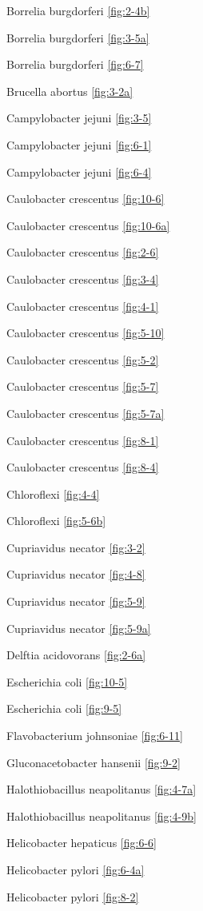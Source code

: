 \documentclass[]{tufte-book}
\begin{document}
Borrelia burgdorferi \ref{fig:2-4b}

Borrelia burgdorferi \ref{fig:3-5a}

Borrelia burgdorferi \ref{fig:6-7}

Brucella abortus \ref{fig:3-2a}

Campylobacter jejuni \ref{fig:3-5}

Campylobacter jejuni \ref{fig:6-1}

Campylobacter jejuni \ref{fig:6-4}

Caulobacter crescentus \ref{fig:10-6}

Caulobacter crescentus \ref{fig:10-6a}

Caulobacter crescentus \ref{fig:2-6}

Caulobacter crescentus \ref{fig:3-4}

Caulobacter crescentus \ref{fig:4-1}

Caulobacter crescentus \ref{fig:5-10}

Caulobacter crescentus \ref{fig:5-2}

Caulobacter crescentus \ref{fig:5-7}

Caulobacter crescentus \ref{fig:5-7a}

Caulobacter crescentus \ref{fig:8-1}

Caulobacter crescentus \ref{fig:8-4}

Chloroflexi \ref{fig:4-4}

Chloroflexi \ref{fig:5-6b}

Cupriavidus necator \ref{fig:3-2}

Cupriavidus necator \ref{fig:4-8}

Cupriavidus necator \ref{fig:5-9}

Cupriavidus necator \ref{fig:5-9a}

Delftia acidovorans \ref{fig:2-6a}

Escherichia coli \ref{fig:10-5}

Escherichia coli \ref{fig:9-5}

Flavobacterium johnsoniae \ref{fig:6-11}

Gluconacetobacter hansenii \ref{fig:9-2}

Halothiobacillus neapolitanus \ref{fig:4-7a}

Halothiobacillus neapolitanus \ref{fig:4-9b}

Helicobacter hepaticus \ref{fig:6-6}

Helicobacter pylori \ref{fig:6-4a}

Helicobacter pylori \ref{fig:8-2}
\end{document}
